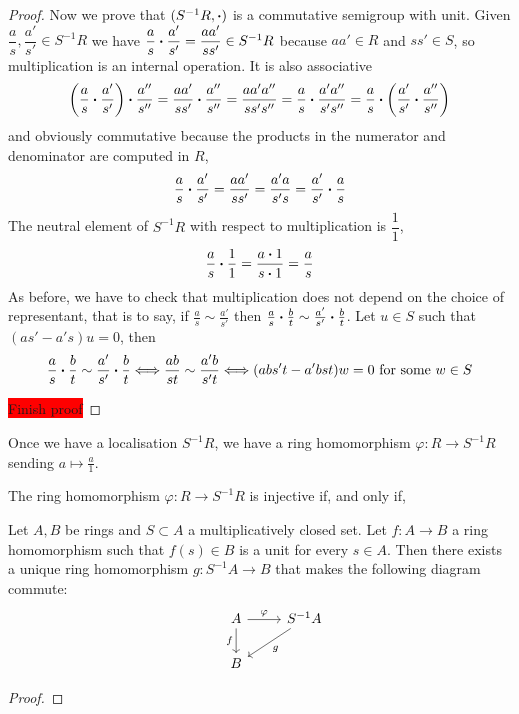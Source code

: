 \begin{proof}
	Now we prove that $(S^{-1} R, \vdot)$ is a commutative semigroup with unit. Given $\dfrac{a}{s}, \dfrac{a'}{s'} \in S^{-1} R$ we have $\dfrac{a}{s} \vdot \dfrac{a'}{s'} = \dfrac{a a'}{s s'} \in S^{-1} R$ because $a a' \in R$ and $s s' \in S$, so multiplication is an internal operation. It is also associative
	\[
		\left( \frac{a}{s} \vdot \frac{a'}{s'} \right) \vdot \frac{a''}{s''} =
		\frac{a a'}{s s'} \vdot \frac{a''}{s''} = 
		\frac{a a' a''}{s s' s''} = 
		\frac{a}{s} \vdot \frac{a' a''}{s' s''} = 
		\frac{a}{s} \vdot \left( \frac{a'}{s'} \vdot \frac{a''}{s''} \right)
	\]
	and obviously commutative because the products in the numerator and denominator are computed in $R$,
	\[
		\frac{a}{s} \vdot \frac{a'}{s'} = 
		\frac{a a'}{s s'} = 
		\frac{a' a}{s' s} = 
		\frac{a'}{s'} \vdot \frac{a}{s}
	\]
	The neutral element of $S^{-1} R$ with respect to multiplication is $\dfrac{1}{1}$, 
	\[
		\frac{a}{s} \vdot \frac{1}{1} = \frac{a \vdot 1}{s \vdot 1} = \frac{a}{s}
	\]
	As before, we have to check that multiplication does not depend on the choice of representant, that is to say, if $\frac{a}{s} \sim \frac{a'}{s'}$ then $\frac{a}{s} \vdot \frac{b}{t} \sim \frac{a'}{s'} \vdot \frac{b}{t}$. Let $u \in S$ such that $(a s' - a' s) u = 0$, then
	\[
		\frac{a}{s} \vdot \frac{b}{t} \sim \frac{a'}{s'} \vdot \frac{b}{t} \Longleftrightarrow
		\frac{a b}{s t} \sim \frac{a' b}{s' t} \Longleftrightarrow
		(a b s' t - a' b s t) w = 0 \text{ for some } w \in S
	\]
	
	\colorbox{red}{Finish proof}
\end{proof}

Once we have a localisation $S^{-1} R$, we have a ring homomorphism $\varphi \colon R \rightarrow S^{-1} R$ sending $a \mapsto \frac{a}{1}$.

\begin{prop}
	The ring homomorphism $\varphi \colon R \rightarrow S^{-1} R$ is injective if, and only if, 
\end{prop}

\begin{theorem}
	Let $A, B$ be rings and $S \subset A$ a multiplicatively closed set. Let $f \colon A \rightarrow B$ a ring homomorphism such that $f(s) \in B$ is a unit for every $s \in A$. Then there exists a unique ring homomorphism $g \colon S^{-1} A \rightarrow B$ that makes the following diagram commute:
	\[
		\begin{tikzcd}
			&A \arrow[r, "\varphi"] \arrow[d, swap, "f"] &S^{-1} A \arrow[ld, "g"] \\
			&B
		\end{tikzcd}
	\]
\end{theorem}
\begin{proof}
		
\end{proof}



